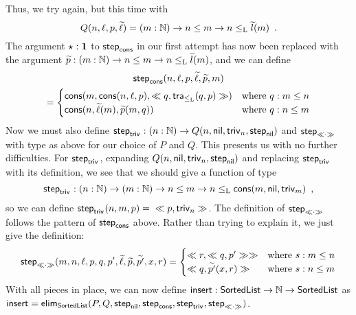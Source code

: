\documentclass{article}
\begin{document}
\begin{example}
Thus, we try again, but this time with 
\[
Q(n, \ell, p,\stepindarg{\ell})
   = (m : \Nat) \to n \leq m \to n \lessList \stepindarg{l}(m) \enspace .
\]
The argument $\oneelt : \one$ to $\stepind{\consListbare}$ in our
first attempt has now been replaced with the argument $\stepindarg{p}
: (m : \Nat) \to n \leq m \to n \lessList \stepindarg{l}(m)$, and we can define
\begin{multline*}
\stepind{\consListbare}(n, \ell, p, \stepindarg{\ell}, \stepindarg{p}, m) \\=
\begin{cases}
  \consList{m}{\consList{n}{\ell}{p}}{\consLess{m}{n}{\ell}{p}{q}{\lessListtrans{q}{p}}} & \text{where $q : m \leq n$} \\
  \consList{n}{\stepindarg{\ell}(m)}{\stepindarg{p}(m, q)} & \text{where $q : n \leq m$} 
\end{cases}
\end{multline*}
%
Now we must also define $\stepind{\nilLess{}} : (n : \Nat) \to Q(n,
\nilList, \nilLess{n}, \stepind{\nilList})$ and
$\stepind{\consLessbare}$ with type as above for our choice of $P$ and
$Q$. This presents us with no further difficulties. For
$\stepind{\nilLess{}}$, expanding $Q(n, \nilList, \nilLess{n},
\stepind{\nilList})$ and replacing $\stepind{\nilLess{}}$ with its
definition, we see that we should give a function of type
\[
\stepind{\nilLess{}} : (n : \Nat) \to (m : \Nat) \to n \leq m \to n
\lessList \consList{m}{\nilList}{\nilLess{m}} \enspace ,
\]
so we can define $\stepind{\nilLess{}}(n, m, p) = {}
\consLess{n}{m}{\nilList}{\nilLess{m}}{p}{\nilLess{n}}$. The
definition of $\stepind{\consLessbare}$ follows the pattern of $\stepind{\consListbare}$
above. Rather than trying to explain it, we just give the definition:
\[
\stepind{\consLessbare}(m, n, \ell, p, q, p', \stepindarg{\ell}, \stepindarg{p}, \stepindarg{p'}, x, r) =
\begin{cases}
  \consLess{m}{x}{\consList{n}{\ell}{p}}{\consLess{m}{n}{\ell}{p}{s}{\lessListtrans{s}{p}}}{r}{\consLess{m}{n}{\ell}{p}{q}{p'}} & \text{where $s : m \leq n$} \\
  \consLess{m}{n}{p'}{\stepindarg{p}(x, s)}{q}{\stepindarg{p'}(x, r)} & \text{where $s : n \leq m$} 
\end{cases}
\]
%
With all pieces in place, we can now define $\Listinsert : \SortedList
\to \Nat \to \SortedList$ as $\Listinsert = \elim_{\SortedList}(P, Q,
\stepind{\nilList}, \stepind{\consListbare}, \stepind{\nilLess{}},
\stepind{\consLessbare})$.
\blackqed


\end{example}
\end{document}
